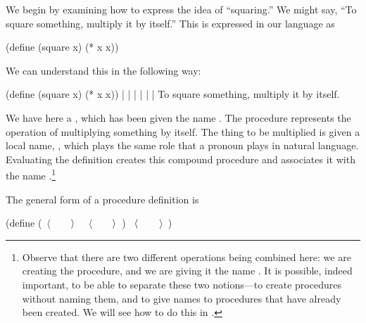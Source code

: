 We begin by examining how to express the idea of ``squaring.''  We might say,
``To square something, multiply it by itself.''  This is expressed in our
language as

\begin{codeBlock}
(define (square x) (* x x))
\end{codeBlock}

\noindent
We can understand this in the following way:

\begin{codeBlock}
(define (square    x)         (*      x         x))
  |        |       |           |      |         |
 To     square  something,  multiply  it  by  itself.
\end{codeBlock}

\noindent
We have here a , which has been given the name
.  The procedure represents the operation of multiplying something
by itself.  The thing to be multiplied is given a local name, , which
plays the same role that a pronoun plays in natural language.  Evaluating the
definition creates this compound procedure and associates it with the name
.\footnote{Observe that there are two different operations being
combined here: we are creating the procedure, and we are giving it the name
.  It is possible, indeed important, to be able to separate these
two notions---to create procedures without naming them, and to give names to
procedures that have already been created.  We will see how to do this in
.}

The general form of a procedure definition is

\begin{codeBlock}
(define (~\(\langle \)~~~~\(\kern0.03em\rangle \)~ ~\(\langle \)~~~~\(\kern0.02em\rangle \)~)
  ~\(\langle\kern0.08em \)~~~~\(\rangle \)~)
\end{codeBlock}

